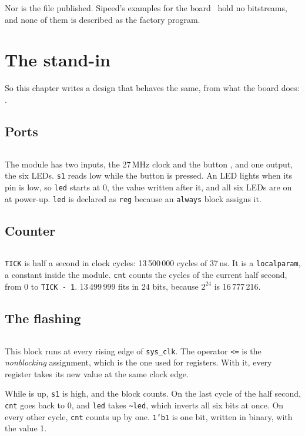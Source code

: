 \documentclass[11pt,a4paper]{article}
\begin{document}
Nor is the file published. Sipeed’s examples for the board~\cite{examples} hold no bitstreams, and none of them is described as the factory program.

\section*{The stand-in}

So this chapter writes a design that behaves the same, from what the board does: .

\subsection*{Ports}

\inputminted[firstline=5, lastline=9]{verilog}{../rtl/factory/factory.v}

The module has two inputs, the 27\,MHz clock and the button , and one output, the six LEDs. \texttt{s1} reads low while the button is pressed. An LED lights when its pin is low, so \texttt{led} starts at 0, the value written after it, and all six LEDs are on at power-up. \texttt{led} is declared as \texttt{reg} because an \texttt{always} block assigns it.

\subsection*{Counter}

\inputminted[firstline=11, lastline=13]{verilog}{../rtl/factory/factory.v}

\texttt{TICK} is half a second in clock cycles: 13\,500\,000 cycles of 37\,ns. It is a \texttt{localparam}, a constant inside the module. \texttt{cnt} counts the cycles of the current half second, from 0 to \texttt{TICK - 1}. 13\,499\,999 fits in 24 bits, because $2^{24}$ is 16\,777\,216.

\subsection*{The flashing}

\inputminted[firstline=15, lastline=22]{verilog}{../rtl/factory/factory.v}

This block runs at every rising edge of \texttt{sys\_clk}. The operator \texttt{<=} is the \emph{nonblocking} assignment, which is the one used for registers. With it, every register takes its new value at the same clock edge.

While  is up, \texttt{s1} is high, and the block counts. On the last cycle of the half second, \texttt{cnt} goes back to 0, and \texttt{led} takes \texttt{\~{}led}, which inverts all six bits at once. On every other cycle, \texttt{cnt} counts up by one. \texttt{1'b1} is one bit, written in binary, with the value 1.
\end{document}
